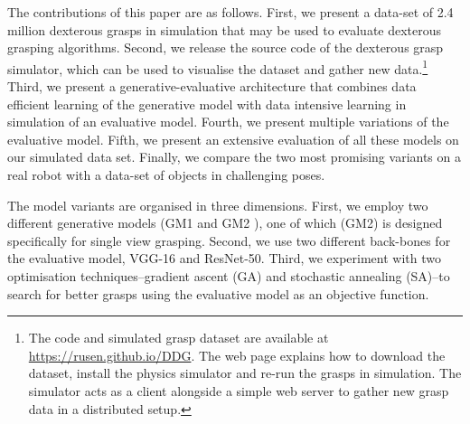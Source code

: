 The contributions of this paper are as follows. First, we present a data-set of 2.4 million dexterous grasps in simulation that may be used to evaluate dexterous grasping algorithms. Second, we release the source code of the dexterous grasp simulator, which can be used to visualise the dataset and gather new data.\footnote{The code and simulated grasp dataset are available at \href{https://rusen.github.io/DDG}{https://rusen.github.io/DDG}. The web page explains how to download the dataset, install the physics simulator and re-run the grasps in simulation. The simulator acts as a client alongside a simple web server to gather new grasp data in a distributed setup.} Third, we present a generative-evaluative architecture that combines data efficient learning of the generative model with data intensive learning in simulation of an evaluative model. Fourth, we present multiple variations of the evaluative model. Fifth, we present an extensive evaluation of all these models on our simulated data set. Finally, we compare the two most promising variants on a real robot with a data-set of objects in challenging poses.

The model variants are organised in three dimensions. First, we employ two different generative models (GM1 \cite{kopicki2015ijrr} and GM2 \cite{kopicki2019ijrr}), one of which (GM2) is designed specifically for single view grasping. Second, we use two different back-bones for the evaluative model, VGG-16 and ResNet-50. Third, we experiment with two optimisation techniques--gradient ascent (GA) and stochastic annealing (SA)--to search for better grasps using the evaluative model as an objective function.


